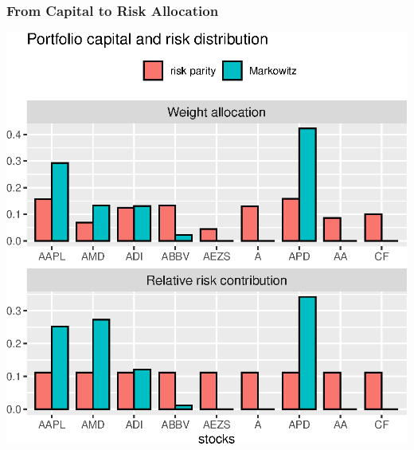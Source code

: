 \documentclass{beamer}
\begin{document}
                \begin{frame}[fragile]
                  \frametitle{From Capital to Risk Allocation}
                  \vspace{1cm}
                  \begin{center}
                    \includegraphics[scale=.65]{codes/markowitz-rpp-comparison.eps}
                  \end{center}
                \end{frame}

\end{document}
